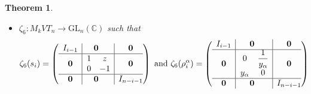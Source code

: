 \documentclass[preprint]{elsarticle}
\newtheorem{theorem}{Theorem}[section]
\begin{document}
\begin{theorem}
\begin{itemize}
{$$\begin{array}{c|@{}c|c@{}}
   \begin{matrix}
     I_{i-1} 
   \end{matrix} 
      & \textbf{0} & \textbf{0} \\
      \hline
    \textbf{0} &\hspace{0.2cm} \begin{matrix}
   		0 & \dfrac{1}{y_{\alpha}}\\
   		y_{\alpha} & 0\\
   		\end{matrix}  & \textbf{0}  \\
\hline
\textbf{0} & \textbf{0} & I_{n-i-1}
\end{array} \right)$$
}
$\text{ for } 1\leq i \leq n-1, 0 \leq \alpha \leq k-1, \text{ where } y_{\alpha}\in \mathbb{C}^*.$
\item[(6)] $\zeta_6: M_kVT_n \longrightarrow \mathrm{GL}_n(\mathbb{C})$ such that
{\small
$$\zeta_6(s_i)=\left( \begin{array}{c|@{}c|c@{}}
   \begin{matrix}
     I_{i-1} 
   \end{matrix} 
      & \textbf{0} & \textbf{0} \\
      \hline
    \textbf{0} &\hspace{0.2cm} \begin{matrix}
   		1 & z\\
   		0 & -1\\
   		\end{matrix}  & \textbf{0}  \\
\hline
\textbf{0} & \textbf{0} & I_{n-i-1}
\end{array} \right) \text{ and } \zeta_6(\rho_i^{\alpha})=\left( \begin{array}{c|@{}c|c@{}}
   \begin{matrix}
     I_{i-1} 
   \end{matrix} 
      & \textbf{0} & \textbf{0} \\
      \hline
    \textbf{0} &\hspace{0.2cm} \begin{matrix}
   		0 & \dfrac{1}{y_{\alpha}}\\
   		y_{\alpha} & 0\\
   		\end{matrix}  & \textbf{0}  \\
\hline
\textbf{0} & \textbf{0} & I_{n-i-1}
\end{array} \right)$$
}
\end{itemize}
\end{theorem}
\end{document}
